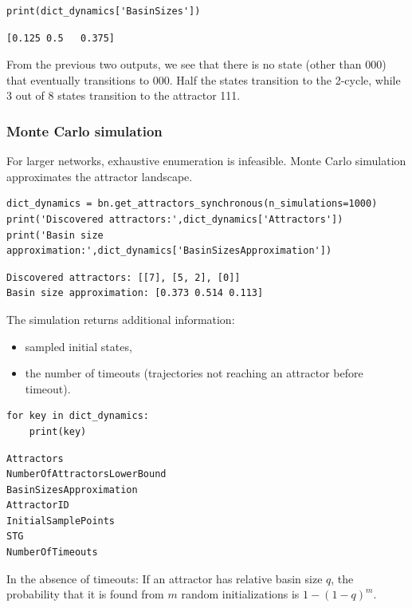 \documentclass[
]{article}
\providecommand{\tightlist}{%
  \setlength{\itemsep}{0pt}\setlength{\parskip}{0pt}}
\begin{document}
\begin{lstlisting}
print(dict_dynamics['BasinSizes'])
\end{lstlisting}

\begin{lstlisting}
[0.125 0.5   0.375]
\end{lstlisting}

From the previous two outputs, we see that there is no state (other than
000) that eventually transitions to 000. Half the states transition to
the 2-cycle, while 3 out of 8 states transition to the attractor 111.

\subsubsection{Monte Carlo simulation}\label{monte-carlo-simulation}

For larger networks, exhaustive enumeration is infeasible. Monte Carlo
simulation approximates the attractor landscape.

\begin{lstlisting}
dict_dynamics = bn.get_attractors_synchronous(n_simulations=1000)
print('Discovered attractors:',dict_dynamics['Attractors'])
print('Basin size approximation:',dict_dynamics['BasinSizesApproximation'])
\end{lstlisting}

\begin{lstlisting}
Discovered attractors: [[7], [5, 2], [0]]
Basin size approximation: [0.373 0.514 0.113]
\end{lstlisting}

The simulation returns additional information:

\begin{itemize}
\tightlist
\item
  sampled initial states,
\item
  the number of timeouts (trajectories not reaching an attractor before
  timeout).
\end{itemize}

\begin{lstlisting}
for key in dict_dynamics:
    print(key)
\end{lstlisting}

\begin{lstlisting}
Attractors
NumberOfAttractorsLowerBound
BasinSizesApproximation
AttractorID
InitialSamplePoints
STG
NumberOfTimeouts
\end{lstlisting}

In the absence of timeouts: If an attractor has relative basin size
\(q\), the probability that it is found from \(m\) random
initializations is \(1 - (1-q)^m\).
\end{document}
